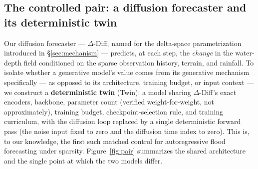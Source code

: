 \documentclass[11pt]{article}
\newcommand{\ours}{\mbox{$\Delta$-Diff}}       %
\newcommand{\twin}{\mbox{Twin}}                 %
\begin{document}
\subsection{The controlled pair: a diffusion forecaster and its deterministic twin}
\label{sec:twin}
Our diffusion forecaster --- \ours{}, named for the delta-space
parametrization introduced in \S\ref{sec:mechanism} --- predicts, at each
step, the \emph{change} in the water-depth field conditioned on the sparse
observation history, terrain, and rainfall. To isolate whether a
generative model's value comes from its generative mechanism specifically
--- as opposed to its architecture, training budget, or input context ---
we construct a \textbf{deterministic twin} (\twin{}): a model sharing
\ours{}'s exact encoders, backbone, parameter count (verified weight-for-weight,
not approximately), training budget, checkpoint-selection rule, and
training curriculum, with the diffusion loop replaced by a single
deterministic forward pass (the noise input fixed to zero and the
diffusion time index to zero). This is, to our knowledge, the first such
matched control for autoregressive flood forecasting under sparsity.
Figure~\ref{fig:pair} summarizes the shared architecture and the single
point at which the two models differ.
\end{document}
